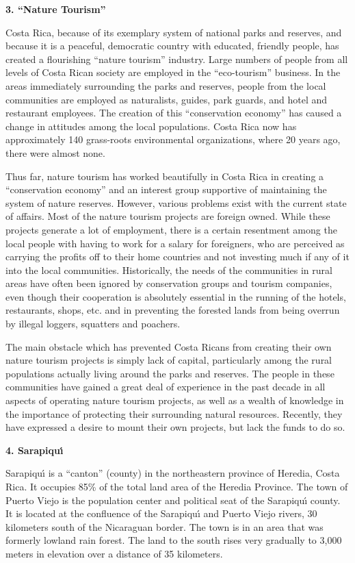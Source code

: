 \LP
{\large {\bf 3. ``Nature Tourism''}}
\eLP

Costa Rica, because of its exemplary system of national parks and
reserves, and because it is a peaceful, democratic country with
educated, friendly people, has created a flourishing ``nature
tourism'' industry.  Large numbers of people from all levels of Costa
Rican society are employed in the ``eco-tourism'' business.  In the
areas immediately surrounding the parks and reserves, people from
the local communities are employed as naturalists, guides, park
guards, and hotel and restaurant employees.  The creation of this
``conservation economy'' has caused a change in attitudes among the
local populations.  Costa Rica now has approximately 140 grass-roots
environmental organizations, where 20 years ago, there were almost
none.

Thus far, nature tourism has worked beautifully in Costa Rica in
creating a ``conservation economy'' and an interest group supportive
of maintaining the system of nature reserves.  However, various
problems exist with the current state of affairs.  Most of the
nature tourism projects are foreign owned.  While these projects generate
a lot of employment, there is a certain resentment among the local
people with having to work for a salary for foreigners, who are
perceived as carrying the profits off to their home countries and
not investing much if any of it into the local communities.
Historically, the needs of the communities in rural areas have
often been ignored by conservation groups and tourism companies,
even though their cooperation is absolutely essential in the
running of the hotels, restaurants, shops, etc. and in preventing
the forested lands from being overrun by illegal loggers, squatters
and poachers.

The main obstacle which has prevented Costa Ricans from creating
their own nature tourism projects is simply lack of capital,
particularly among the rural populations actually living around the
parks and reserves.  The people in these communities have gained a
great deal of experience in the past decade in all aspects of
operating nature tourism projects, as well as a wealth of knowledge in
the importance of protecting their surrounding natural resources.
Recently, they have expressed a desire to mount their own projects,
but lack the funds to do so.

\LP
{\large {\bf 4.  Sarapiqu\'{\i}}}
\eLP

Sarapiqu\'{\i} is a ``canton'' (county) in the northeastern province of
Heredia, Costa Rica.  It occupies 85\% of the total land area of the
Heredia Province.  The town of Puerto Viejo is the population center
and political seat of the Sarapiqu\'{\i} county.  It is located at the
confluence of the Sarapiqu\'{\i} and Puerto Viejo rivers, 30 kilometers
south of the Nicaraguan border.  The town is in an area that was formerly
lowland rain forest.  The land to the south rises very gradually to
3,000 meters in elevation over a distance of 35 kilometers.

